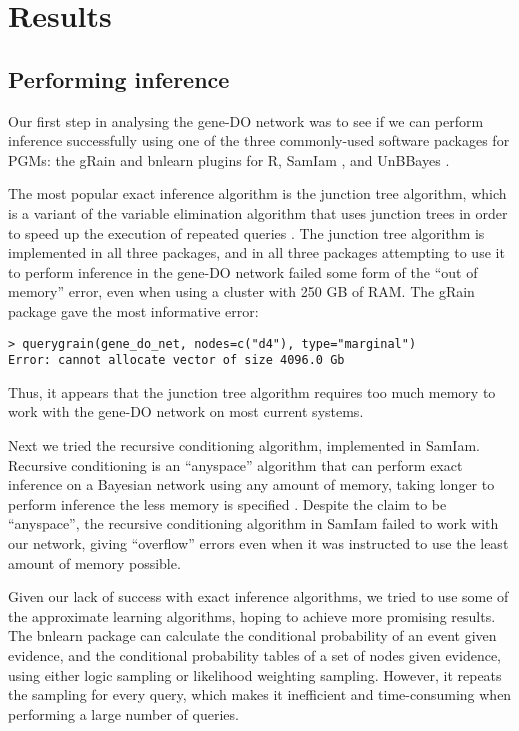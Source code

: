 \documentclass[11pt]{article}
\begin{document}
\section{Results}


\subsection{Performing inference}

Our first step in analysing the gene-DO network was to see if we can perform inference successfully using one of the three commonly-used software packages for PGMs: the gRain \cite{Hojsgaard2012} and bnlearn \cite{Scutari2010} plugins for R, SamIam \cite{Gaag2007}, and UnBBayes \cite{Matsumoto}.

The most popular exact inference algorithm is the junction tree algorithm, which is a variant of the variable elimination algorithm that uses junction trees in order to speed up the execution of repeated queries \cite{Darwiche2009}. The junction tree algorithm is implemented in all three packages, and in all three packages attempting to use it to perform inference in the gene-DO network failed some form of the ``out of memory'' error, even when using a cluster with 250 GB of RAM. The gRain package gave the most informative error:

\begin{verbatim}
> querygrain(gene_do_net, nodes=c("d4"), type="marginal")
Error: cannot allocate vector of size 4096.0 Gb
\end{verbatim}

Thus, it appears that the junction tree algorithm requires too much memory to work with the gene-DO network on most current systems. 


Next we tried the recursive conditioning algorithm, implemented in SamIam. Recursive conditioning is an ``anyspace'' algorithm that can perform exact inference on a Bayesian network using any amount of memory, taking longer to perform inference the less memory is specified \cite{Darwiche2009}. Despite the claim to be ``anyspace'', the recursive conditioning algorithm in SamIam failed to work with our network, giving ``overflow'' errors even when it was instructed to use the least amount of memory possible.

Given our lack of success with exact inference algorithms, we tried to use some of the approximate learning algorithms, hoping to achieve more promising results. The bnlearn package can calculate the conditional probability of an event given evidence, and the conditional probability tables of a set of nodes given evidence, using either logic sampling or likelihood weighting sampling. However, it repeats the sampling for every query, which makes it inefficient and time-consuming when performing a large number of queries. 
\end{document}
